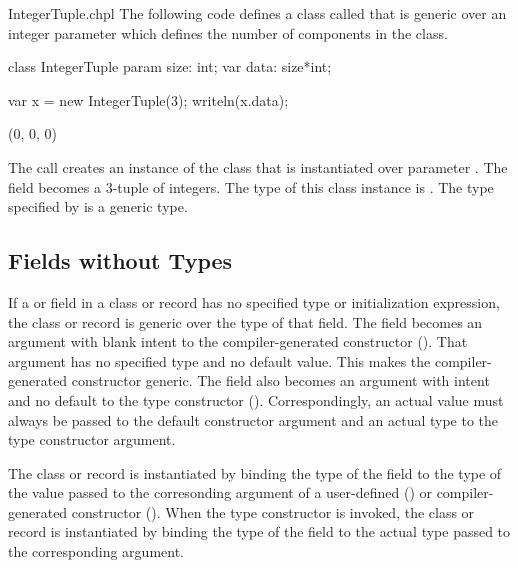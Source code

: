 \begin{chapelexample}{IntegerTuple.chpl}
The following code defines a class called  that is
generic over an integer parameter which defines the number of
components in the class.
\begin{chapel}
class IntegerTuple {
  param size: int;
  var data: size*int;
}
\end{chapel}
\begin{chapelpost}
var x = new IntegerTuple(3);
writeln(x.data);
\end{chapelpost}
\begin{chapeloutput}
(0, 0, 0)
\end{chapeloutput}
The call  creates an instance of the
 class that is instantiated over parameter
.  The field  becomes a 3-tuple of integers.  The
type of this class instance is .  The type
specified by  is a generic type.
\end{chapelexample}

\subsection{Fields without Types}
\label{Fields_without_Types}

If a  or  field in a class or record has no specified type or
initialization expression, the class or record is generic over the
type of that field.  The field becomes an argument with blank intent to
the compiler-generated constructor ().
That argument has no specified type and no default
value. This makes the compiler-generated constructor generic.
The field also becomes an argument with  intent and no default
to the type constructor ().
Correspondingly, an actual value must always be passed to the default
constructor argument and an actual type to the type constructor argument.

The class or record is instantiated by binding the type of the field
to the type of the value passed to the corresonding argument
of a user-defined () or compiler-generated constructor ().
When the type constructor is invoked, the class or record is instantiated
by binding the type of the field to the actual type passed to
the corresponding argument.

